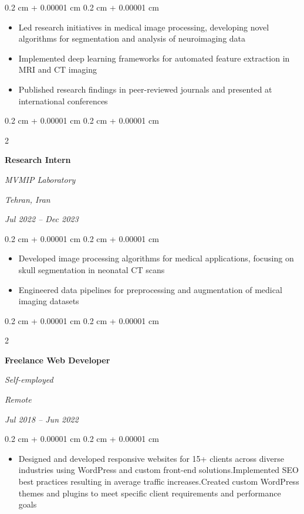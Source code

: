 \documentclass[10pt, letterpaper]{article}
\newenvironment{highlights}{
    \begin{itemize}[
        topsep=0.10 cm,
        parsep=0.10 cm,
        partopsep=0pt,
        itemsep=0pt,
        leftmargin=0.4 cm + 10pt
    ]
}{
    \end{itemize}
} %
\newenvironment{onecolentry}{
    \begin{adjustwidth}{
        0.2 cm + 0.00001 cm
    }{
        0.2 cm + 0.00001 cm
    }
}{
    \end{adjustwidth}
} %
\newenvironment{twocolentry}[2][]{
    \onecolentry
    \def\secondColumn{#2}
    \setcolumnwidth{\fill, 5.5 cm}
    \begin{paracol}{2}
}{
    \switchcolumn \raggedleft \secondColumn
    \end{paracol}
    \endonecolentry
} %
\begin{document}
    \vspace{0.10 cm}
    \begin{onecolentry}
    	\begin{highlights}
    		\item Led research initiatives in medical image processing, developing novel algorithms for segmentation and analysis of neuroimaging data
    		\item Implemented deep learning frameworks for automated feature extraction in MRI and CT imaging
    		\item Published research findings in peer-reviewed journals and presented at international conferences
    	\end{highlights}
    \end{onecolentry}
    
    
    \vspace{0.2 cm}
    
    \begin{twocolentry}{
    		\textit{Tehran, Iran}    
    		
    		\textit{Jul 2022 – Dec 2023}}
    	\textbf{Research Intern}
    	
    	\textit{MVMIP Laboratory}
    \end{twocolentry}
    
    \vspace{0.10 cm}
    \begin{onecolentry}
    	\begin{highlights}
    		\item Developed image processing algorithms for medical applications, focusing on skull segmentation in neonatal CT scans
    		\item Engineered data pipelines for preprocessing and augmentation of medical imaging datasets
    	\end{highlights}
    \end{onecolentry}
    
    \vspace{0.2 cm}
    
    \begin{twocolentry}{
    		\textit{Remote}    
    		
    		\textit{Jul 2018 – Jun 2022}}
    	\textbf{Freelance Web Developer}
    	
    	\textit{Self-employed}
    \end{twocolentry}
    
    \vspace{0.10 cm}
    \begin{onecolentry}
    	\begin{highlights}
    		\item Designed and developed responsive websites for 15+ clients across diverse industries using WordPress and custom front-end solutions.Implemented SEO best practices resulting in average traffic increases.Created custom WordPress themes and plugins to meet specific client requirements and performance goals
    	\end{highlights}
    \end{onecolentry}
\end{document}
